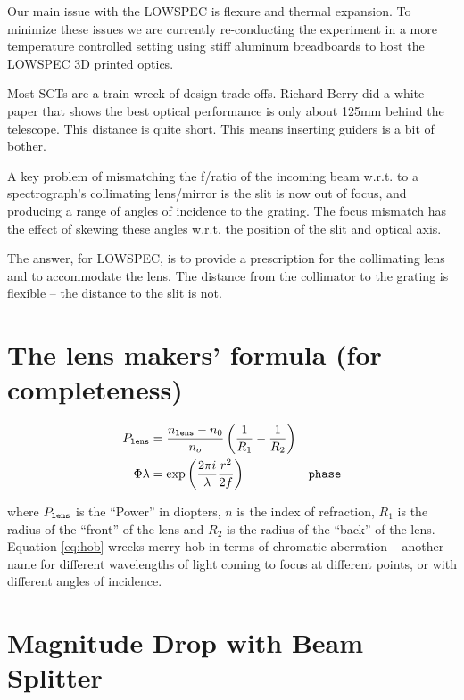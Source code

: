 \documentclass[letter,11pt,oneside]{article}
\begin{document}
Our main issue with the LOWSPEC is flexure and thermal expansion.
To minimize these issues we are currently re-conducting the
experiment in a more temperature controlled setting using
stiff aluminum breadboards to host the LOWSPEC 3D printed
optics.

Most SCTs are a train-wreck of design trade-offs. Richard Berry
did a white paper that shows the best optical performance is
only about 125mm behind the telescope. This distance is quite
short. This means inserting guiders is a bit of bother.


A key problem of mismatching the f/ratio of the incoming beam w.r.t.
to a spectrograph's collimating lens/mirror is the slit is now
out of focus, and producing a range of angles of incidence
to the grating. The focus mismatch has the effect of skewing
these angles w.r.t. the position of the slit and optical axis.

The answer, for LOWSPEC, is to provide a prescription for the
collimating lens and to accommodate the lens. The distance
from the collimator to the grating is flexible -- the distance
to the slit is not. 



\section{The lens makers' formula (for completeness)} \label{sec:lensmakersformula}

\begin{subequations}
\begin{align}
P_{\tt{lens}} &= \frac{n_{\tt{lens}} - n_{0}}{n_{o}} \left( \frac{1}{R_{1}} - \frac{1}{R_{2}} \right) \\
\Phi{\lambda} &= \exp\left(\frac{2\pi i}{\lambda} \frac{r^2}{2f}\right) & \tt{phase} \label{eq:hob}
\end{align}
\end{subequations}

where $P_{\tt{lens}}$ is the ``Power'' in diopters, $n$ is the index
of refraction, $R_{1}$ is the radius of the ``front'' of the lens and
$R_{2}$ is the radius of the ``back'' of the lens. Equation
\eqref{eq:hob} wrecks merry-hob in terms of chromatic aberration --
another name for different wavelengths of light coming to focus at
different points, or with different angles of incidence.


\section{Magnitude Drop with Beam Splitter}
\end{document}

